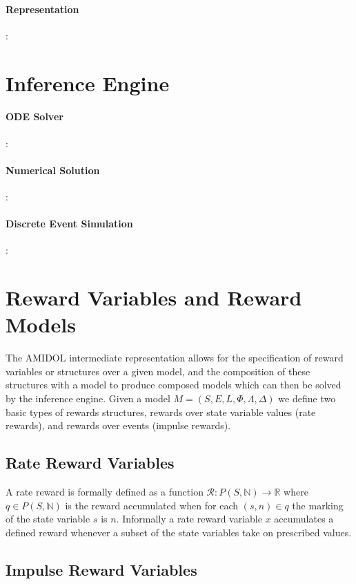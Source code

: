 \documentclass[11pt]{article}
\newcommand{\amidol}{\textsc{AMIDOL}}
\begin{document}
\paragraph{Representation}:

\section{Inference Engine}
\paragraph{ODE Solver}:

\paragraph{Numerical Solution}:

\paragraph{Discrete Event Simulation}:

\section{Reward Variables and Reward Models}

The \amidol{} intermediate representation allows for the specification of reward variables or structures over a given model, and the composition of these structures with a model to produce composed models which can then be solved by the inference engine.  Given a model $M = (S, E, L, \Phi, \Lambda, \Delta)$ we define two basic types of rewards structures, rewards over state variable values (rate rewards), and rewards over events (impulse rewards).

\subsection{Rate Reward Variables}

A rate reward is formally defined as a function $\mathcal{R}: P(S, \mathbb{N}) \rightarrow \mathbb{R}$ where $q \in P(S, \mathbb{N})$ is the reward accumulated when for each $(s,n) \in q$ the marking of the state variable $s$ is $n$.  Informally a rate reward variable $x$ accumulates a defined reward whenever a subset of the state variables take on prescribed values.

\subsection{Impulse Reward Variables}
\end{document}
